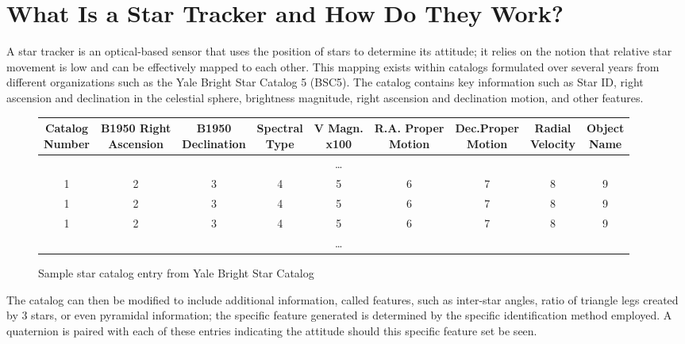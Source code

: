 \section*{What Is a Star Tracker and How Do They Work?}
\par \qquad A star tracker is an optical-based sensor that uses the position of stars to determine its attitude; it relies on the notion that relative star movement is low and can be effectively mapped to each other.
This mapping exists within catalogs formulated over several years from different organizations such as the Yale Bright Star Catalog 5 (BSC5). 
The catalog contains key information such as Star ID, right ascension and declination in the celestial sphere, brightness magnitude, right ascension and declination motion, and other features.

\begin{figure}
    \begin{adjustbox}{center}
\begin{tabular}{|| c c c c c c c c c ||}
    \hline
    \thead{Catalog\\Number} & \thead{B1950 Right\\Ascension} & \thead{B1950\\Declination} & \thead{Spectral\\Type} & \thead{V Magn.\\ x100} & \thead{R.A. Proper\\Motion} & \thead{Dec.Proper\\Motion} & \thead{Radial\\Velocity} & \thead{Object\\Name} \\ [0.5ex] 
    \hline\hline

    & & & & \dots & & & & \\ 
    \hline
    1 & 2 & 3 & 4 & 5 & 6 & 7 & 8 & 9 \\
    \hline
    1 & 2 & 3 & 4 & 5 & 6 & 7 & 8 & 9 \\
    \hline
    1 & 2 & 3 & 4 & 5 & 6 & 7 & 8 & 9 \\
    \hline
    & & & & \dots & & & & \\ 
    \hline


\end{tabular}
\end{adjustbox}
\caption{Sample star catalog entry from Yale Bright Star Catalog}
\end{figure}

\par \qquad The catalog can then be modified to include additional information, called features, such as inter-star angles, ratio of triangle legs created by 3 stars, or even pyramidal information; the specific feature generated is determined by the specific identification method employed.
A quaternion is paired with each of these entries indicating the attitude should this specific feature set be seen.

